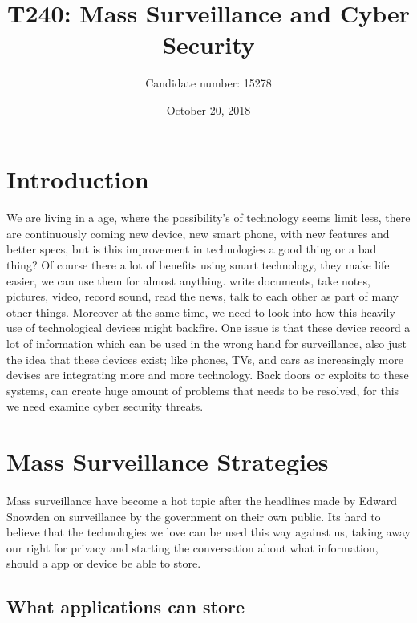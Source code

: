 \documentclass{article}
\title{T240: Mass Surveillance and Cyber Security}
\author{Candidate number: 15278}
\date{October 20, 2018}
\begin{document}
\maketitle
\newpage

\tableofcontents
\newpage

\section{Introduction}
\paragraph{}
We are living in a age, where the possibility's of technology seems limit less, there are continuously coming new device, new smart phone, with new features and better specs, but is this improvement in technologies a good thing or a bad thing? Of course there a lot of benefits using smart technology, they make life easier, we can use them for almost anything. write documents, take notes, pictures, video,  record sound, read the news, talk to each other as part of many other things. Moreover at the same time, we need to look into how this heavily use of technological devices might backfire. One issue is that these device record a lot of information which can be used in the wrong hand for surveillance, also just the idea that these devices exist; like phones, TVs, and cars as increasingly more devises are integrating more and more technology. Back doors or exploits to these systems, can create huge amount of problems that needs to be resolved, for this we need examine cyber security threats.

\section{Mass Surveillance Strategies}

\paragraph{}
Mass surveillance have become a hot topic after the headlines made by Edward Snowden on surveillance by the government on their own public. Its hard to believe that the technologies we love can be used this way against us, taking away our right for privacy and starting the conversation about what information, should a app or device be able to store. 

\subsection{What applications can store}
\end{document}
